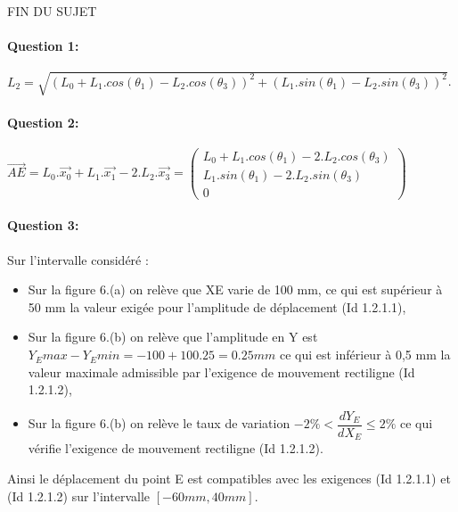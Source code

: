 \begin{center}
FIN DU SUJET
\end{center}

\newpage
\cleardoublepage

\ifdef{\public}{}{}

\ifdef{\public}{}{}


\newpage
\cleardoublepage

\pagestyle{correction}\setcounter{section}{0}

\paragraph{Question 1:} $L_2=\sqrt{(L_0+L_1.cos(\theta_1)-L_2.cos(\theta_3))^2+(L_1.sin(\theta_1)-L_2.sin(\theta_3))^2}$.

\paragraph{Question 2:} $\overrightarrow{AE}=L_0.\overrightarrow{x_0}+L_1.\overrightarrow{x_1}-2.L_2.\overrightarrow{x_3}=\left(\begin{array}{c} L_0+L_1.cos(\theta_1)-2.L_2.cos(\theta_3) \\ L_1.sin(\theta_1)-2.L_2.sin(\theta_3) \\ 0
\end{array}\right)$

\paragraph{Question 3:} Sur l'intervalle considéré :
\begin{itemize}
 \item Sur la figure 6.(a) on relève que XE varie de 100 mm, ce qui est supérieur à 50 mm la valeur exigée pour l'amplitude de déplacement (Id 1.2.1.1),
 \item Sur la figure 6.(b) on relève que l'amplitude en Y est $Y_E{max}-Y_E{min}=-100+100.25=0.25mm$ ce qui est inférieur à 0,5 mm la valeur maximale admissible par l'exigence de mouvement rectiligne (Id 1.2.1.2),
 \item Sur la figure 6.(b) on relève le taux de variation $-2\%<\dfrac{dY_E}{dX_E} \leq 2\% $ ce qui vérifie l'exigence de mouvement rectiligne (Id 1.2.1.2).
\end{itemize}

Ainsi le déplacement du point E est compatibles avec les exigences (Id 1.2.1.1) et (Id 1.2.1.2) sur l'intervalle $[ -60 mm, 40 mm]$.

